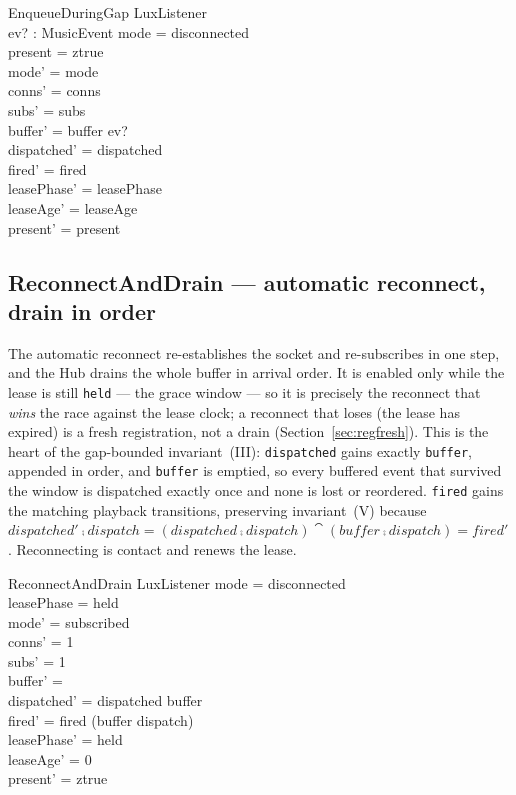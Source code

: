 \documentclass[a4paper,10pt,fleqn]{article}
\begin{document}
\begin{schema}{EnqueueDuringGap}
  \Delta LuxListener \\
  ev? : MusicEvent
  \where
  mode = disconnected \\
  present = ztrue \\
  mode' = mode \\
  conns' = conns \\
  subs' = subs \\
  buffer' = buffer \cat \langle ev? \rangle \\
  dispatched' = dispatched \\
  fired' = fired \\
  leasePhase' = leasePhase \\
  leaseAge' = leaseAge \\
  present' = present
\end{schema}

\subsection{ReconnectAndDrain --- automatic reconnect, drain in order}

The automatic reconnect re-establishes the socket and re-subscribes in one step,
and the Hub drains the whole buffer in arrival order. It is enabled only while
the lease is still \texttt{held} --- the grace window --- so it is precisely the
reconnect that \emph{wins} the race against the lease clock; a reconnect that
loses (the lease has expired) is a fresh registration, not a drain
(Section~\ref{sec:regfresh}). This is the heart of the gap-bounded
invariant~(III): \texttt{dispatched} gains exactly \texttt{buffer}, appended in
order, and \texttt{buffer} is emptied, so every buffered event that survived the
window is dispatched exactly once and none is lost or reordered. \texttt{fired}
gains the matching playback transitions, preserving invariant~(V) because
$dispatched' \comp dispatch = (dispatched \comp dispatch) \cat (buffer \comp
dispatch) = fired'$. Reconnecting is contact and renews the lease.

\begin{schema}{ReconnectAndDrain}
  \Delta LuxListener
  \where
  mode = disconnected \\
  leasePhase = held \\
  mode' = subscribed \\
  conns' = 1 \\
  subs' = 1 \\
  buffer' = \langle \rangle \\
  dispatched' = dispatched \cat buffer \\
  fired' = fired \cat (buffer \comp dispatch) \\
  leasePhase' = held \\
  leaseAge' = 0 \\
  present' = ztrue
\end{schema}
\end{document}
